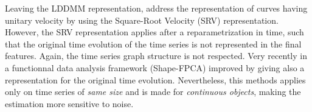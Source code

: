   Leaving the LDDMM representation, \cite{srivastava2010shape,heo2024logistic} address the representation of curves having unitary velocity by using the Square-Root Velocity (SRV) representation.
 However, the SRV representation applies after a reparametrization in time, such that the original time evolution of the time series is not represented in the final features.
  Again, the time series graph structure is not respected.
   Very recently in a functionnal data analysis framework \cite{wu2024shape} (Shape-FPCA) improved by giving also a representation for the original time evolution.
    Nevertheless, this methods applies only on time series of \textit{same size} and is made for \textit{continuous objects}, making the estimation more sensitive to noise.
